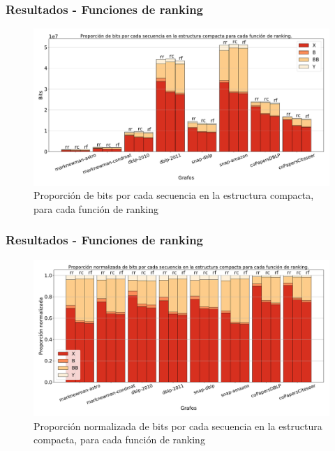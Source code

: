\begin{frame}
\frametitle{Resultados - Funciones de ranking}

\begin{figure}
    	\centering
    \includegraphics[width=1\linewidth]{../img/bits.pdf}
    	
    \caption{Proporción de bits por cada secuencia en la estructura compacta, para cada función de ranking}
\end{figure}

\end{frame}

\begin{frame}
\frametitle{Resultados - Funciones de ranking}

\begin{figure}
    	\centering
    \includegraphics[width=1\linewidth]{../img/bitsNorm.pdf}
    	
    \caption{Proporción normalizada de bits por cada secuencia en la estructura compacta, para cada función de ranking}
\end{figure}

\end{frame}


